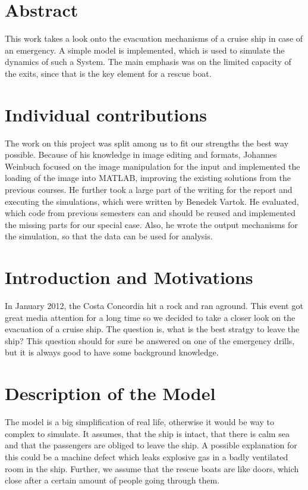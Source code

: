 \documentclass[11pt]{article}
\begin{document}
\section{Abstract}

This work takes a look onto the evacuation mechanisms of a cruise ship in case of an emergency.
A simple model is implemented, which is used to simulate the dynamics of such a System. 
The main emphasis was on the limited capacity of the exits, since that is the key element for a
rescue boat. 


\section{Individual contributions}

The work on this project was split among us to fit our strengths the best way possible.
Because of his knowledge in image editing and formats, Johannes Weinbuch focused on the 
image manipulation for the input and implemented the loading of the image into MATLAB,
improving the existing solutions from the previous courses. He further took a large part of the writing for the report and executing the simulations, which were written by Benedek Vartok.
He evaluated, which code from previous semesters can and should be reused and implemented the missing parts for our special case. Also, he wrote the output mechanisms for the simulation, so that the data can be used for analysis.


\section{Introduction and Motivations}
In January 2012, the Costa Concordia hit a rock and ran aground\cite{bbcnews}.
This event got great media attention for a long time so we decided to take a closer look
on the evacuation of a cruise ship. The question is, what is the best stratgy to leave the ship?
This question should for sure be answered on one of the emergency drills, but it is always good 
to have some background knowledge.

\section{Description of the Model}

The model is a big simplification of real life, otherwise it would be way to complex to simulate.
It assumes, that the ship is intact, that there is calm sea and that the passengers are obliged to leave the ship. 
A possible explanation for this could be a machine defect which leaks explosive gas in a badly ventilated room in the ship. Further, we assume that the rescue boats are like doors, which close after a certain amount of people going through them. 
\end{document}

